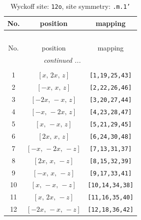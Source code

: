 \documentclass[fleqn,8pt]{jsarticle}
\begin{document}
\begin{longtable}{ccc}
\caption{Wyckoff site: {\tt 12o}, site symmetry: {\tt .m.1'}}
 \\
 \hline \hline
No. & position & mapping \\ \hline \endfirsthead

\multicolumn{2}{l}{\tablename\ \thetable{}} \\
 \hline \hline
No. & position & mapping \\ \hline \endhead

 \hline \hline
\multicolumn{2}{r}{\footnotesize\it continued ...} \\ \endfoot

 \hline \hline
\multicolumn{2}{r}{} \\ \endlastfoot

1 & $\left[ x,\, 2 x,\, z \right]$ & {\tt [1,19,25,43]} \\ \hline
2 & $\left[ - x,\, x,\, z \right]$ & {\tt [2,22,26,46]} \\ \hline
3 & $\left[ - 2 x,\, - x,\, z \right]$ & {\tt [3,20,27,44]} \\ \hline
4 & $\left[ - x,\, - 2 x,\, z \right]$ & {\tt [4,23,28,47]} \\ \hline
5 & $\left[ x,\, - x,\, z \right]$ & {\tt [5,21,29,45]} \\ \hline
6 & $\left[ 2 x,\, x,\, z \right]$ & {\tt [6,24,30,48]} \\ \hline
7 & $\left[ - x,\, - 2 x,\, - z \right]$ & {\tt [7,13,31,37]} \\ \hline
8 & $\left[ 2 x,\, x,\, - z \right]$ & {\tt [8,15,32,39]} \\ \hline
9 & $\left[ - x,\, x,\, - z \right]$ & {\tt [9,17,33,41]} \\ \hline
10 & $\left[ x,\, - x,\, - z \right]$ & {\tt [10,14,34,38]} \\ \hline
11 & $\left[ x,\, 2 x,\, - z \right]$ & {\tt [11,16,35,40]} \\ \hline
12 & $\left[ - 2 x,\, - x,\, - z \right]$ & {\tt [12,18,36,42]} \\
\end{longtable}
\renewcommand{\arraystretch}{1.2}
\end{document}
